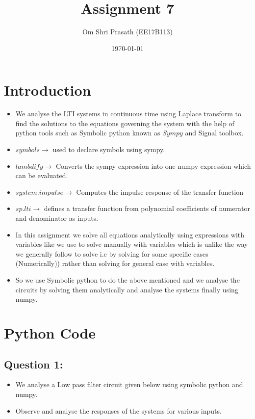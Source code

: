 \documentclass[11pt, a4paper]{article}
\title{Assignment 7} %
\author{Om Shri Prasath (EE17B113)} %
\date{\today} %
\begin{document}
	

\maketitle %
\section{Introduction}\label{introduction}

\begin{itemize}
\item
  We analyse the LTI systems in continuous time using Laplace
  transform to find the solutions to the equations governing the system
  with the help of python tools such as Symbolic python known as
  \(Sympy\) and Signal toolbox.\\
\item
  $symbols \to $ used to declare symbols using sympy.
\item
  $lambdify \to $ Converts the sympy expression into one numpy
  expression which can be evaluated.
\item
  \(system.impulse \to\) Computes the impulse response of the transfer
  function
\item
  \(sp.lti \to\) defines a transfer function from polynomial
  coefficients of numerator and denominator as inputs.
\item
  In this assignment we solve all equations analytically using
  expressions with variables like we use to solve manually with
  variables which is unlike the way we generally follow to solve i.e by
  solving for some specific cases (Numerically)) rather than solving for
  general case with variables.
\item
  So we use Symbolic python to do the above mentioned and we analyse the
  circuits by solving them analytically and analyse the systems finally
  using numpy.
\end{itemize}   
\newpage
\section{Python Code}\label{code}

\subsection{Question 1:}\label{question-1}

\begin{itemize}
\item
  We analyse a Low pass filter circuit given below using symbolic python
  and numpy.
\item
  Observe and analyse the responses of the systems for various inputs.
\end{itemize}
\end{document}

